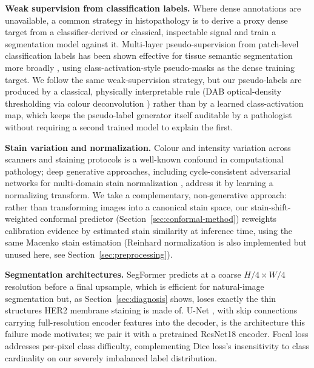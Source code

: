 \documentclass[conference]{IEEEtran}
\begin{document}
\textbf{Weak supervision from classification labels.} Where dense
annotations are unavailable, a common strategy in histopathology is to
derive a proxy dense target from a classifier-derived or classical,
inspectable signal and train a segmentation model against it. Multi-layer
pseudo-supervision from patch-level classification labels has been shown
effective for tissue semantic segmentation more broadly
\cite{han2021}, using class-activation-style pseudo-masks as the dense
training target. We follow the same weak-supervision strategy, but our
pseudo-labels are produced by a classical, physically interpretable rule
(DAB optical-density thresholding via colour deconvolution
\cite{ruifrok2001}) rather than by a learned class-activation map, which
keeps the pseudo-label generator itself auditable by a pathologist without
requiring a second trained model to explain the first.

\textbf{Stain variation and normalization.} Colour and intensity variation
across scanners and staining protocols is a well-known confound in
computational pathology; deep generative approaches, including
cycle-consistent adversarial networks for multi-domain stain normalization
\cite{hetz2024}, address it by learning a normalizing transform. We take a
complementary, non-generative approach: rather than transforming images
into a canonical stain space, our stain-shift-weighted conformal predictor
(Section~\ref{sec:conformal-method}) reweights calibration evidence by
estimated stain similarity at inference time, using the same Macenko stain
estimation \cite{macenko2009} (Reinhard normalization \cite{reinhard2001}
is also implemented but unused here, see Section~\ref{sec:preprocessing}).

\textbf{Segmentation architectures.} SegFormer \cite{xie2021} predicts at a
coarse $H/4 \times W/4$ resolution before a final upsample, which is
efficient for natural-image segmentation but, as Section~\ref{sec:diagnosis}
shows, loses exactly the thin structures HER2 membrane staining is made of.
U-Net \cite{ronneberger2015}, with skip connections carrying full-resolution
encoder features into the decoder, is the architecture this failure mode
motivates; we pair it with a pretrained ResNet18 \cite{he2016} encoder.
Focal loss \cite{lin2017} addresses per-pixel class difficulty, complementing
Dice loss's insensitivity to class cardinality on our severely imbalanced
label distribution.
\end{document}
